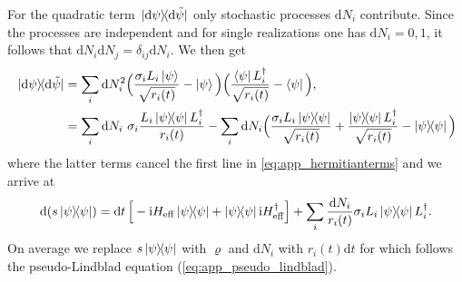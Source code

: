 \documentclass[twocolumn,prl,superscriptaddress]{revtex4-2}
\renewcommand{\i}{\mathrm i}
\begin{document}
For the quadratic term $\dyad*{\mathrm d \psi}{\mathrm d \tilde \psi}$ only stochastic processes $\mathrm d N_i$ contribute. Since the processes are independent and for single realizations one has $\mathrm dN_i=0,1$, it follows that $\mathrm dN_i \mathrm dN_j = \delta_{ij}\mathrm dN_i$. We then get
\begin{align}
	\begin{split}
		\dyad*{\mathrm d \psi}{\mathrm d \tilde \psi} & = \sum_i \mathrm dN_i^2 \Big(\frac{\sigma_iL_i \ket{\psi} }{\sqrt{ r_i(t)}} - \ket{\psi} \Big)\Big(\frac{ \bra{\psi}L_i^\dagger }{\sqrt{ r_i(t)}} - \bra{\psi} \Big) , \\&= \sum_i \mathrm dN_i\ \sigma_i \frac{L_i \dyad{\psi} L_i^\dagger}{ r_i(t)} - \sum_i \mathrm dN_i \Big(\frac{\sigma_i L_i \dyad{\psi}}{\sqrt{ r_i(t)}} + \frac{\dyad{\psi} L_i^\dagger  }{\sqrt{ r_i(t)}} - \dyad{\psi} \Big)
	\end{split}
\end{align}
where the latter terms cancel the first line in \cref{eq:app_hermitianterms} and we arrive at
\begin{align}
	\begin{split}
		\mathrm d (s \dyad{\psi}) %
		=\mathrm dt\, \Big[- \i H_\mathrm{eff} \dyad{\psi} + \dyad \psi \i H_\mathrm{eff}^\dagger\Big] +  \sum_i  \frac{\mathrm dN_i }{ r_i(t) } \sigma_i L_i \dyad{\psi}L_i^\dagger .
	\end{split}
\end{align}
On average we replace $s\dyad{\psi}$ with $\varrho$ and $\mathrm dN_i$ with $ r_i(t) \mathrm dt$ for which follows the pseudo-Lindblad equation (\ref{eq:app_pseudo_lindblad}). 
\end{document}
